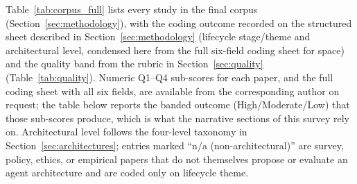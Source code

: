 \documentclass[sn-basic,Numbered]{sn-jnl}
\begin{document}
Table~\ref{tab:corpus_full} lists every study in the final corpus
(Section~\ref{sec:methodology}), with the coding outcome recorded on
the structured sheet described in Section~\ref{sec:methodology}
(lifecycle stage/theme and architectural level, condensed here from
the full six-field coding sheet for space) and the quality band from
the rubric in Section~\ref{sec:quality} (Table~\ref{tab:quality}).
Numeric Q1--Q4 sub-scores for each paper, and the full coding sheet
with all six fields, are available from the corresponding author on
request; the table below reports the banded outcome (High/Moderate/Low)
that those sub-scores produce, which is what the narrative sections of
this survey rely on. Architectural level follows the four-level
taxonomy in Section~\ref{sec:architectures}; entries marked
``n/a (non-architectural)'' are survey, policy, ethics, or empirical
papers that do not themselves propose or evaluate an agent
architecture and are coded only on lifecycle theme.
\end{document}
